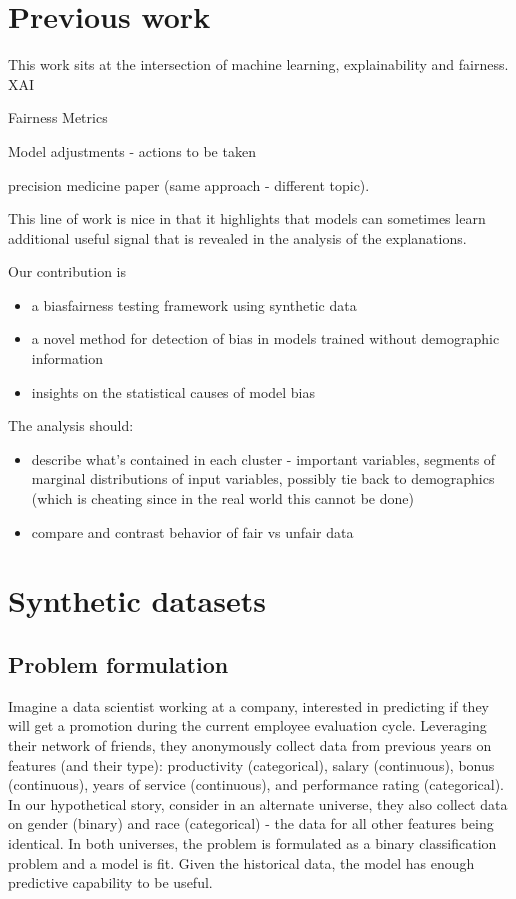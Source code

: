 \documentclass[manuscript,screen,review]{acmart}
\begin{document}
\section{Previous work}
This work sits at the intersection of machine learning, explainability and fairness. 
XAI

Fairness Metrics

Model adjustments - actions to be taken

precision medicine paper (same approach - different topic).  

This line of work is nice in that it highlights that models can sometimes learn additional useful signal that is revealed in the analysis of the explanations.

Our contribution is
\begin{itemize}
    \item a bias\/fairness testing framework using synthetic data
    \item a novel method for detection of bias in models trained without demographic information
    \item insights on the statistical causes of model bias
\end{itemize}

The analysis should:
\begin{itemize}
    \item describe what's contained in each cluster - important variables, segments of marginal distributions of input variables, possibly tie back to demographics (which is cheating since in the real world this cannot be done)
    \item compare and contrast behavior of fair vs unfair data
\end{itemize}


\section{Synthetic datasets}
\subsection{Problem formulation}
Imagine a data scientist working at a company, interested in predicting if they will get a promotion during the current employee evaluation cycle.  Leveraging their network of friends, they anonymously collect data from previous years on features (and their type): productivity (categorical), salary (continuous), bonus (continuous), years of service (continuous),  and performance rating (categorical).  In our hypothetical story, consider in an alternate universe, they also collect data on gender (binary) and race (categorical) - the data for all other features being identical. In both universes, the problem is formulated as a binary classification problem and a model is fit.  Given the historical data, the model has enough predictive capability to be useful.
\end{document}
